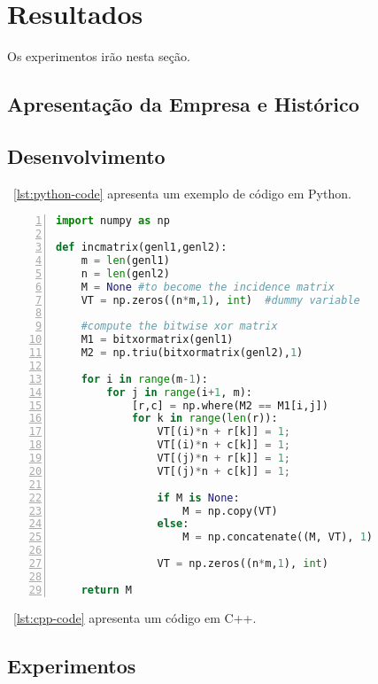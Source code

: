 \chapter{Resultados}\label{chap:Results}

Os experimentos irão nesta seção.

\section{Apresentação da Empresa e Histórico}


\section{Desenvolvimento} \label{sec:dev}


\lstlistingname~\ref{lst:python-code} apresenta um exemplo de código em Python.

\begin{lstlisting}[numbers=left, language=Python, style=mycode, caption={Exemplo de código em Python.}, label={lst:python-code}]
import numpy as np
 
def incmatrix(genl1,genl2):
    m = len(genl1)
    n = len(genl2)
    M = None #to become the incidence matrix
    VT = np.zeros((n*m,1), int)  #dummy variable
 
    #compute the bitwise xor matrix
    M1 = bitxormatrix(genl1)
    M2 = np.triu(bitxormatrix(genl2),1) 
 
    for i in range(m-1):
        for j in range(i+1, m):
            [r,c] = np.where(M2 == M1[i,j])
            for k in range(len(r)):
                VT[(i)*n + r[k]] = 1;
                VT[(i)*n + c[k]] = 1;
                VT[(j)*n + r[k]] = 1;
                VT[(j)*n + c[k]] = 1;
 
                if M is None:
                    M = np.copy(VT)
                else:
                    M = np.concatenate((M, VT), 1)
 
                VT = np.zeros((n*m,1), int)
 
    return M
\end{lstlisting}

\lstlistingname~\ref{lst:cpp-code} apresenta um código em C++.




\section{Experimentos} \label{sec:exp}




